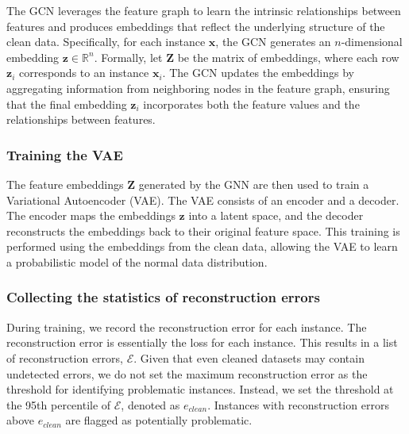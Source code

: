 The GCN leverages the feature graph to learn the intrinsic relationships between features and produces embeddings that reflect the underlying structure of the clean data. Specifically, for each instance \( \mathbf{x} \), the GCN generates an \( n \)-dimensional embedding \( \mathbf{z} \in \mathbb{R}^n \). 
Formally, let \( \mathbf{Z} \) be the matrix of embeddings, where each row \( \mathbf{z}_i \) corresponds to an instance \( \mathbf{x}_i \). 
The GCN updates the embeddings by aggregating information from neighboring nodes in the feature graph, ensuring that the final embedding \( \mathbf{z}_i \) incorporates both the feature values and the relationships between features.



\subsubsection{\textbf{Training the VAE}}
The feature embeddings \( \mathbf{Z} \) generated by the GNN are then used to train a Variational Autoencoder (VAE). 
The VAE consists of an encoder and a decoder. The encoder maps the embeddings \( \mathbf{z} \) into a latent space, and the decoder reconstructs the embeddings back to their original feature space. This training is performed using the embeddings from the clean data, allowing the VAE to learn a probabilistic model of the normal data distribution.

\subsubsection{\textbf{Collecting the statistics of reconstruction errors}}
During training, we record the reconstruction error for each instance. The reconstruction error is essentially the loss for each instance. This results in a list of reconstruction errors, \(\mathcal{E}\). Given that even cleaned datasets may contain undetected errors, we do not set the maximum reconstruction error as the threshold for identifying problematic instances. Instead, we set the threshold at the 95th percentile of \(\mathcal{E}\), denoted as \( e_{clean} \). Instances with reconstruction errors above \( e_{clean} \) are flagged as potentially problematic.


